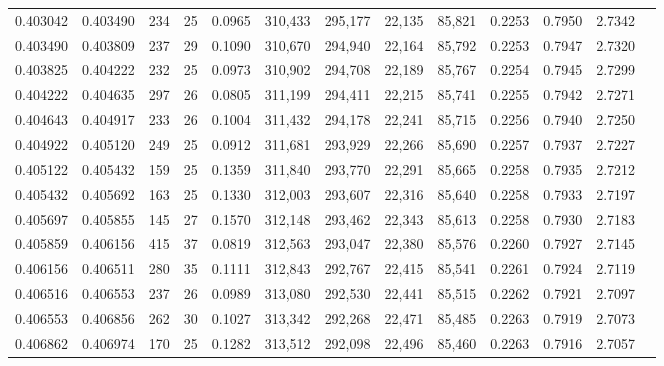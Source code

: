 \begin{tabular}{rrrrrrrrrrrrr}
0.403042 & 0.403490 &   234 &  25 &                                     0.0965 & 310,433 & 295,177 &  22,135 &  85,821 & 0.2253 & 0.7950 & 2.7342 \\
0.403490 & 0.403809 &   237 &  29 &                                     0.1090 & 310,670 & 294,940 &  22,164 &  85,792 & 0.2253 & 0.7947 & 2.7320 \\
0.403825 & 0.404222 &   232 &  25 &                                     0.0973 & 310,902 & 294,708 &  22,189 &  85,767 & 0.2254 & 0.7945 & 2.7299 \\
0.404222 & 0.404635 &   297 &  26 &                                     0.0805 & 311,199 & 294,411 &  22,215 &  85,741 & 0.2255 & 0.7942 & 2.7271 \\
0.404643 & 0.404917 &   233 &  26 &                                     0.1004 & 311,432 & 294,178 &  22,241 &  85,715 & 0.2256 & 0.7940 & 2.7250 \\
0.404922 & 0.405120 &   249 &  25 &                                     0.0912 & 311,681 & 293,929 &  22,266 &  85,690 & 0.2257 & 0.7937 & 2.7227 \\
0.405122 & 0.405432 &   159 &  25 &                                     0.1359 & 311,840 & 293,770 &  22,291 &  85,665 & 0.2258 & 0.7935 & 2.7212 \\
0.405432 & 0.405692 &   163 &  25 &                                     0.1330 & 312,003 & 293,607 &  22,316 &  85,640 & 0.2258 & 0.7933 & 2.7197 \\
0.405697 & 0.405855 &   145 &  27 &                                     0.1570 & 312,148 & 293,462 &  22,343 &  85,613 & 0.2258 & 0.7930 & 2.7183 \\
0.405859 & 0.406156 &   415 &  37 &                                     0.0819 & 312,563 & 293,047 &  22,380 &  85,576 & 0.2260 & 0.7927 & 2.7145 \\
0.406156 & 0.406511 &   280 &  35 &                                     0.1111 & 312,843 & 292,767 &  22,415 &  85,541 & 0.2261 & 0.7924 & 2.7119 \\
0.406516 & 0.406553 &   237 &  26 &                                     0.0989 & 313,080 & 292,530 &  22,441 &  85,515 & 0.2262 & 0.7921 & 2.7097 \\
0.406553 & 0.406856 &   262 &  30 &                                     0.1027 & 313,342 & 292,268 &  22,471 &  85,485 & 0.2263 & 0.7919 & 2.7073 \\
0.406862 & 0.406974 &   170 &  25 &                                     0.1282 & 313,512 & 292,098 &  22,496 &  85,460 & 0.2263 & 0.7916 & 2.7057 \\

\end{tabular}
